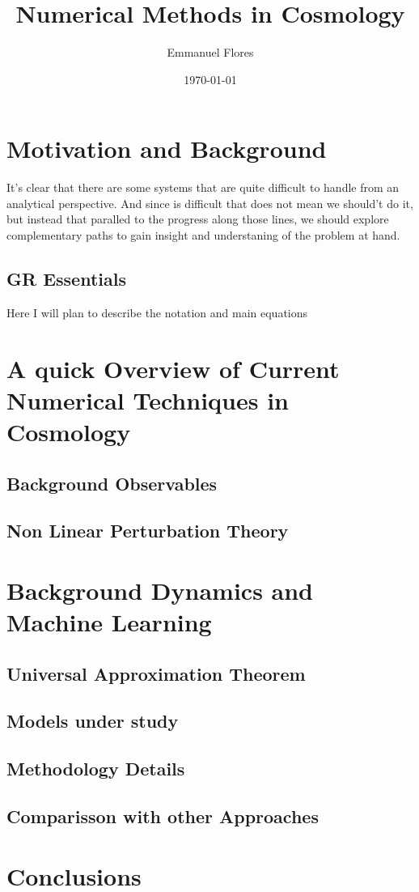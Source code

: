 \documentclass[twocolumn, 10pt, letterpaper]{article}
\title{Numerical Methods in Cosmology}
\author{Emmanuel Flores}
\date{\today}
\begin{document}
\maketitle
{}
\section{Motivation and Background}
It's clear that there are some systems that are quite difficult to handle from an analytical perspective. And since is difficult that does not mean we should't do it, but instead that paralled to the progress along those lines, we should explore complementary paths to gain insight and understaning of the problem at hand.
\subsection{GR Essentials}
Here I will plan to describe the notation and main equations
\section{A quick Overview of Current Numerical Techniques in Cosmology}
\subsection{Background Observables}
\subsection{Non Linear Perturbation Theory}
\section{Background Dynamics and Machine Learning}
\subsection{Universal Approximation Theorem}
\subsection{Models under study}
\subsection{Methodology Details}
\subsection{Comparisson with other Approaches}
\section{Conclusions}
\end{document}
